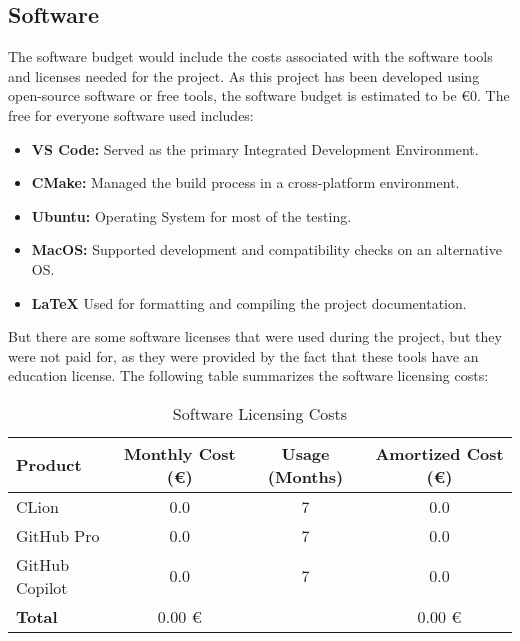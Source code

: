 \subsection{Software}
The software budget would include the costs associated with the software tools and licenses needed for the project. As this project has been developed using open-source software or free tools, the software budget is estimated to be €0. The free for everyone software used includes:
\begin{itemize}
    \item \textbf{VS Code:} Served as the primary Integrated Development Environment.
    \item \textbf{CMake:} Managed the build process in a cross-platform environment.
    \item \textbf{Ubuntu:} Operating System for most of the testing.
    \item \textbf{MacOS:} Supported development and compatibility checks on an alternative OS.
    \item \textbf{\LaTeX } Used for formatting and compiling the project documentation.
\end{itemize}

But there are some software licenses that were used during the project, but they were not paid for, as they were provided by the fact that these tools have an education license. The following table summarizes the software licensing costs:

\begin{table}[h]
  \centering
  \caption{Software Licensing Costs}
  \label{tab:software-licensing-costs}
  \begin{tabular}{|l|c|c|c|}
    \hline
    \textbf{Product}     & \textbf{Monthly Cost (€)} & \textbf{Usage (Months)} & \textbf{Amortized Cost (€)} \\
    \hline
    CLion                & 0.0                       & 7                       & 0.0 \\
    GitHub Pro           & 0.0                       & 7                       & 0.0 \\
    GitHub Copilot       & 0.0                       & 7                       & 0.0 \\
    \hline
    \textbf{Total}       & 0.00 €                    &                         & 0.00 € \\
    \hline
  \end{tabular}
\end{table}


